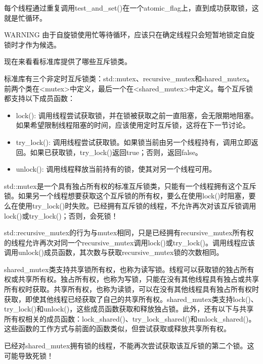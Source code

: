 每个线程通过重复调用test\_and\_set()在一个atomic\_flag上，直到成功获取锁，这就是忙循环。

\begin{myWarning}{WARNING}
由于自旋锁使用忙等待循环，应该只在确定线程只会短暂地锁定自旋锁时才作为候选。
\end{myWarning}

现在来看看标准库提供了哪些互斥锁类。


标准库有三个非定时互斥锁类：std::mutex、recursive\_mutex和shared\_mutex。前两个类在<mutex>中定义，最后一个在<shared\_mutex>中定义。每个互斥锁都支持以下成员函数：

\begin{itemize}
\item
lock(): 调用线程尝试获取锁，并在锁被获取之前一直阻塞，会无限期地阻塞。如果希望限制线程阻塞的时间，应该使用定时互斥锁，这将在下一节讨论。

\item
try\_lock(): 调用线程尝试获取锁。如果锁当前由另一个线程持有，调用立即返回。如果已获取锁，try\_lock()返回true；否则，返回false。

\item
unlock(): 调用线程释放当前持有的锁，使其对另一个线程可用。
\end{itemize}

std::mutex是一个具有独占所有权的标准互斥锁类，只能有一个线程拥有这个互斥锁。如果另一个线程想要获取这个互斥锁的所有权，要么在使用lock()时阻塞，要么在使用try\_lock()时失败。已经拥有互斥锁的线程，不允许再次对该互斥锁调用lock()或try\_lock()；否则，会死锁！

std::recursive\_mutex的行为与mutex相同，只是已经拥有recursive\_mutex所有权的线程允许再次对同一个recursive\_mutex调用lock()或try\_lock()。调用线程应该调用unlock()成员函数，其次数与获取recursive\_mutex锁的次数相同。

shared\_mutex类支持共享锁所有权，也称为读写锁。线程可以获取锁的独占所有权或共享所有权。独占所有权，也称为写锁，只能在没有其他线程具有独占或共享所有权时获取。共享所有权，也称为读锁，可以在没有其他线程具有独占所有权时获取，即使其他线程已经获取了自己的共享所有权。shared\_mutex类支持lock()、try\_lock()和unlock()，这些成员函数获取和释放独占锁。此外，还有以下与共享所有权相关的成员函数：lock\_shared()、try\_lock\_shared()和unlock\_shared()。这些函数的工作方式与前面的函数类似，但尝试获取或释放共享所有权。

已经对shared\_mutex拥有锁的线程，不能再次尝试获取该互斥锁的第二个锁。这可能导致死锁！

